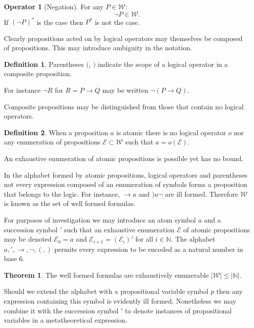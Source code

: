 \documentclass{amsbook}
\newcommand{\wffs}{\mathcal W}
\newcommand{\then}{\mathrel\rightarrow}
\theoremstyle{definition}
\newtheorem{op}{Operator}[chapter]
\newtheorem{thm}{Theorem}[section]
\newtheorem{dfn}{Definition}[section]
\begin{document}
\begin{op}[Negation]
    For any $P \in \wffs$:
    $$
        \neg P \in \wffs.
    $$
    If $(\neg P)^*$ is the case then $P^*$ is not the case.
\end{op}

Clearly propositions acted on by logical operators may themselves be composed of propositions. This may introduce ambiguity in the notation.

\begin{dfn}
    Parentheses $($, $)$ indicate the scope of a logical operator in a composite proposition.
\end{dfn}

For instance $\neg R$ for $R = P \then Q$ may be written $\neg(P \then Q)$.

Composite propositions may be distinguished from those that contain no logical operators.

\begin{dfn}
    When a proposition $a$ is atomic there is no logical operator $o$ nor any enumeration of propositions $\mathcal E \subset \wffs$ such that $a = o(\mathcal E)$.

    An exhaustive enumeration of atomic propositions is possible yet has no bound.
\end{dfn}

In the alphabet formed by atomic propositions, logical operators and parentheses not every expression composed of an enumeration of symbols forms a proposition that belongs to the logic. For instance, $\then a$ and $)a \neg$ are ill formed. Therefore $\mathcal W$ is known as the set of well formed formulas.

For purposes of investigation we may introduce an atom symbol $a$ and a succession symbol $'$ such that an exhaustive enumeration $\mathcal E$ of atomic propositions may be denoted $\mathcal E_0 = a$ and $\mathcal E_{i+1} = (\mathcal E_i)'$ for all $i \in \mathbb N$. The alphabet $a, ', \then, \neg, (, )$ permits every expression to be encoded as a natural number in base $6$.

\begin{thm}
    The well formed formulas are exhaustively enumerable $|\wffs| \leq |\mathbb N|$.
\end{thm}

Should we extend the alphabet with a propositional variable symbol $p$ then any expression containing this symbol is evidently ill formed. Nonetheless we may combine it with the succession symbol $'$ to denote instances of propositional variables in a metatheoretical expression.
\end{document}
